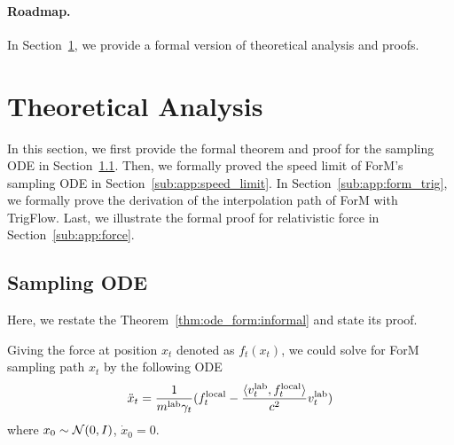 \paragraph{Roadmap.}
In Section~\ref{sec:miss_proof}, we provide a formal version of theoretical analysis and proofs.

\section{Theoretical Analysis} \label{sec:miss_proof}

In this section, we first provide the formal theorem and proof for the sampling ODE in Section~\ref{sub:app:samp_ode}. Then, we formally proved the speed limit of ForM's sampling ODE in Section~\ref{sub:app:speed_limit}. In Section~\ref{sub:app:form_trig}, we formally prove the derivation of the interpolation path of ForM with TrigFlow. Last, we illustrate the formal proof for relativistic force in Section~\ref{sub:app:force}.


\subsection{Sampling ODE} \label{sub:app:samp_ode}

Here, we restate the Theorem~\ref{thm:ode_form:informal} and state its proof.

\begin{theorem}\label{thm:ode_form:formal}
    Giving the force at position $x_t$ denoted as $f_t(x_t)$, we could solve for ForM sampling path $x_t$ by the following ODE
    \begin{align*}
    \ddot{x}_t = \frac{1}{m^{\rm lab} \gamma_t}(f_t^{\rm local} - \frac{\langle v_t^{\rm lab}, f_t^{\rm local} \rangle}{c^2} v_t^{\rm lab})
    \end{align*}
    where $x_0 \sim \mathcal{N}(0,I)$, $\dot{x}_0 = 0$.
\end{theorem}

